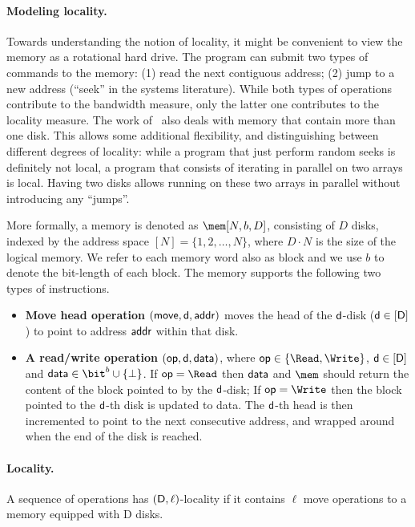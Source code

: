 \paragraph{Modeling locality.}
Towards understanding the notion of locality, it might be convenient to view the memory as a rotational hard drive. The program can submit two types of commands to the memory: (1) read the next contiguous address; (2) jump to a new address (``seek'' in the systems literature). While both types of operations contribute to the bandwidth measure, only the latter one contributes to the locality measure. The work of~\cite{AsharovCNPRS19} also deals with memory that contain more than one disk. This allows some additional flexibility, and distinguishing between different degrees of locality: while a program that just perform random seeks is definitely not local, a program that consists of iterating in parallel on two arrays is local. Having two disks allows running on these two arrays in parallel without introducing any ``jumps''. 

More formally, a memory is denoted as $\mem[N,b, D]$, consisting of $D$ disks, indexed by the address space $[N]= \{1,2,\ldots,N\}$, where $D \cdot N$ is the size of the logical memory. We refer to each memory word also as block and we use $b$ to denote the bit-length of each block. The memory supports the following two types of instructions.
\begin{itemize}
\item {\bf Move head operation $({\sf move},{\sf d},{\sf addr})$} moves the head of the ${\sf d}$-disk (${\sf d} \in [{\sf D}]$) to point to address ${\sf addr}$ within that disk.
\item {\bf A read/write operation $({\sf op},{\sf d},{\sf data})$}, where ${\sf op} \in \{\Read,\Write\}$, ${\sf d} \in [{\sf D}]$ and ${\sf data} \in \bit^{b} \cup \{\bot\}$. If ${\sf op} = \Read$ then ${\sf data}$ and $\mem$ should return the content of the block pointed to by the ${\sf d}$-disk; If ${\sf op} = \Write$ then the block pointed to the ${\sf d}$-th disk is updated to {\sf data}. The ${\sf d}$-th head is then incremented to point to the next consecutive address, and wrapped around when the end of the disk is reached. 
\end{itemize}

\paragraph{Locality.}
A sequence of operations has $({\sf D},\ell)$-locality if it contains $\ell$ {\sf move} operations to a memory equipped with {\sf D} disks. 

